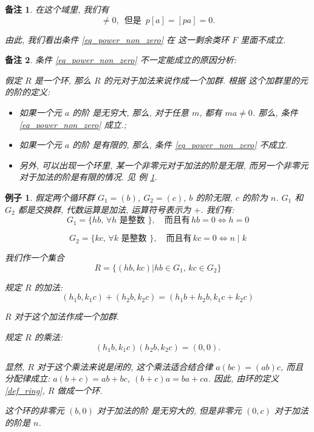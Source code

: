 \documentclass[utf8]{ctexbook}
\newtheorem{memo}{备注}[section]
\newtheorem{example}{例子}[section]
\begin{document}
\begin{memo}
在这个域里, 我们有
\begin{equation}
[a] \neq 0, \, \mbox{ 但是 } \, p [a] = [pa] = 0 .
\end{equation}

由此, 我们看出条件 \ref{eq_power_non_zero} 在 这一剩余类环 $F$ 里面不成立.

\end{memo}

\begin{memo}
条件 \ref{eq_power_non_zero} 不一定能成立的原因分析:

假定 $R$ 是一个环, 那么 $R$ 的元对于加法来说作成一个加群. 根据 这个加群里的元的阶的定义:
\begin{itemize}
\item{如果一个元 $a$ 的阶 是无穷大, 那么, 对于任意 $m$, 都有 $m a \neq 0$. 那么, 条件 \ref{eq_power_non_zero} 成立.;}
\item{如果一个元 $a$ 的阶 是有限的, 那么, 条件 \ref{eq_power_non_zero} 不成立.}
\item{另外, 可以出现一个环里, 某一个非零元对于加法的阶是无限, 而另一个非零元对于加法的阶是有限的情况. 见 例 \ref{example_finite_infinite_rank}.}
\end{itemize}
\end{memo}

\begin{example}
\label{example_finite_infinite_rank}
假定两个循环群 $G_1 = (b)$, $G_2 = (c)$, $b$ 的阶无限, $c$ 的阶为 $n$. $G_1$ 和 $G_2$ 都是交换群, 代数运算是加法, 运算符号表示为 $+$. 我们有:
\begin{equation}
G_1 = \{ hb , \, \forall h \mbox{ 是整数 } \}, \quad \mbox{而且有} \, hb = 0 \iff h = 0
\end{equation}

\begin{equation}
G_2 = \{ kc , \, \forall k \mbox{ 是整数 }  \}, \quad \mbox{而且有} \, kc = 0 \iff  n \mid k 
\end{equation}

我们作一个集合
\begin{equation}
R = \{ (hb, kc) | hb \in G_1, \, kc \in G_2  \}
\end{equation}

规定 $R$ 的加法:
\begin{equation}
(h_1 b , k_1 c ) + (h_2 b , k_2 c) = (h_1 b + h_2 b, k_1 c + k_2 c)
\end{equation}

$R$ 对于这个加法作成一个加群.

规定 $R$ 的乘法:
\begin{equation}
(h_1 b, k_1 c ) (h_2 b, k_2 c) = (0, 0).
\end{equation}

显然, $R$ 对于这个乘法来说是闭的, 这个乘法适合结合律 $a(bc) = (ab) c $, 而且分配律成立: $a(b+c)=ab + bc$, $(b+c)a=ba + ca$. 因此, 由环的定义 \ref{def_ring}, $R$ 做成一个环.

这个环的非零元 $(b, 0)$ 对于加法的阶 是无穷大的, 但是非零元 $(0, c)$ 对于加法的阶是 $n$.


\end{example}
\end{document}
